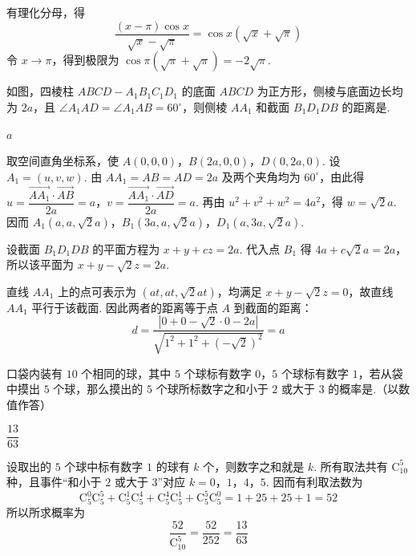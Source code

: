 \begin{solution}
有理化分母，得
\[
\frac{(x-\pi)\cos x}{\sqrt{x}-\sqrt{\pi}}=\cos x\left(\sqrt{x}+\sqrt{\pi}\right)
\]
令 \(x\to\pi\)，得到极限为
\(\cos\pi\left(\sqrt{\pi}+\sqrt{\pi}\right)=-2\sqrt{\pi}\).
\end{solution}

\begin{problem}
如图，四棱柱 \(ABCD - A_{1}B_{1}C_{1}D_{1}\) 的底面 \(ABCD\) 为正方形，侧棱与底面边长均为 \(2a\)，且 \(\angle A_{1}AD = \angle A_{1}AB = 60^{\circ}\)，则侧棱 \(AA_{1}\) 和截面 \(B_{1}D_{1}DB\) 的距离是\fillinblank{}.

\end{problem}

\begin{answer}\(a\)\end{answer}

\begin{solution}
取空间直角坐标系，使
\(A(0,0,0)\)，\(B(2a,0,0)\)，\(D(0,2a,0)\). 设 \(A_1=(u,v,w)\). 由
\(AA_1=AB=AD=2a\) 及两个夹角均为 \(60^\circ\)，由此得
\(u=\dfrac{\overrightarrow{AA_1}\cdot\overrightarrow{AB}}{2a}=a\)，\(v=\dfrac{\overrightarrow{AA_1}\cdot\overrightarrow{AD}}{2a}=a\).
再由 \(u^2+v^2+w^2=4a^2\)，得 \(w=\sqrt2a\). 因而
\(A_1(a,a,\sqrt2a)\)，\(B_1(3a,a,\sqrt2a)\)，\(D_1(a,3a,\sqrt2a)\).

设截面 \(B_1D_1DB\) 的平面方程为 \(x+y+c z=2a\). 代入点 \(B_1\) 得
\(4a+c\sqrt2a=2a\)，所以该平面为
\(x+y-\sqrt2z=2a\).

直线 \(AA_1\) 上的点可表示为 \((at,at,\sqrt2at)\)，均满足
\(x+y-\sqrt2z=0\)，故直线 \(AA_1\) 平行于该截面. 因此两者的距离等于点 \(A\) 到截面的距离：
\[
d=\frac{|0+0-\sqrt2\cdot0-2a|}{\sqrt{1^2+1^2+(-\sqrt2)^2}}=a
\]
\end{solution}

\begin{problem}
口袋内装有 \(10\) 个相同的球，其中 \(5\) 个球标有数字 \(0\)，\(5\) 个球标有数字 \(1\)，若从袋中摸出 \(5\) 个球，那么摸出的 \(5\) 个球所标数字之和小于 \(2\) 或大于 \(3\) 的概率是\fillinblank{}.（以数值作答）
\end{problem}

\begin{answer}\(\dfrac{13}{63}\)\end{answer}

\begin{solution}
设取出的 \(5\) 个球中标有数字 \(1\) 的球有 \(k\) 个，则数字之和就是 \(k\). 所有取法共有 \(\mathrm C_{10}^5\) 种，且事件“和小于 \(2\) 或大于 \(3\)”对应 \(k=0\)，\(1\)，\(4\)，\(5\). 因而有利取法数为
\[
\mathrm C_5^0\mathrm C_5^5+\mathrm C_5^1\mathrm C_5^4+\mathrm C_5^4\mathrm C_5^1+\mathrm C_5^5\mathrm C_5^0=1+25+25+1=52
\]
所以所求概率为
\[
\frac{52}{\mathrm C_{10}^5}=\frac{52}{252}=\frac{13}{63}
\]
\end{solution}

